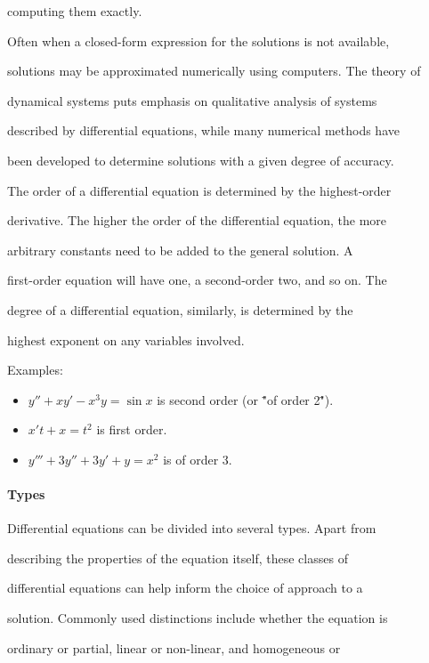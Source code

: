 computing them exactly.



Often when a closed-form expression for the solutions is not available,

solutions may be approximated numerically using computers. The theory of

dynamical systems puts emphasis on qualitative analysis of systems

described by differential equations, while many numerical methods have

been developed to determine solutions with a given degree of accuracy.

The order of a differential equation is determined by the highest-order

derivative. The higher the order of the differential equation, the more

arbitrary constants need to be added to the general solution. A

first-order equation will have one, a second-order two, and so on. The

degree of a differential equation, similarly, is determined by the

highest exponent on any variables involved.



Examples:



\begin{itemize}
    \item $y'' + xy' - x^3y = \sin{x}$ is second order (or \""of order 2\"").
    \item $x't + x = t^2$ is first order.
    \item $y''' + 3y'' + 3y' + y = x^2$ is of order 3.
\end{itemize}

\paragraph{Types}



Differential equations can be divided into several types. Apart from

describing the properties of the equation itself, these classes of

differential equations can help inform the choice of approach to a

solution. Commonly used distinctions include whether the equation is

ordinary or partial, linear or non-linear, and homogeneous or

